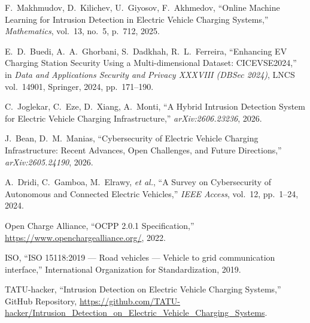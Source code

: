 \documentclass[11pt, a4paper]{article}
\begin{document}
\begin{enumerate}[leftmargin=1.6em, itemsep=0.3em, label={[\arabic*]}]
    \item F.~Makhmudov, D.~Kilichev, U.~Giyosov, F.~Akhmedov, ``Online Machine Learning for Intrusion Detection in Electric Vehicle Charging Systems,'' \textit{Mathematics}, vol.~13, no.~5, p.~712, 2025.

    \item E.~D.~Buedi, A.~A.~Ghorbani, S.~Dadkhah, R.~L.~Ferreira, ``Enhancing EV Charging Station Security Using a Multi-dimensional Dataset: CICEVSE2024,'' in \textit{Data and Applications Security and Privacy XXXVIII (DBSec 2024)}, LNCS vol.~14901, Springer, 2024, pp.~171--190.

    \item C.~Joglekar, C.~Eze, D.~Xiang, A.~Monti, ``A Hybrid Intrusion Detection System for Electric Vehicle Charging Infrastructure,'' \textit{arXiv:2606.23236}, 2026.

    \item J.~Bean, D.~M.~Manias, ``Cybersecurity of Electric Vehicle Charging Infrastructure: Recent Advances, Open Challenges, and Future Directions,'' \textit{arXiv:2605.24190}, 2026.

    \item A.~Dridi, C.~Gamboa, M.~Elrawy, \textit{et al.}, ``A Survey on Cybersecurity of Autonomous and Connected Electric Vehicles,'' \textit{IEEE Access}, vol.~12, pp.~1--24, 2024.

    \item Open Charge Alliance, ``OCPP 2.0.1 Specification,'' \url{https://www.openchargealliance.org/}, 2022.

    \item ISO, ``ISO 15118:2019 — Road vehicles — Vehicle to grid communication interface,'' International Organization for Standardization, 2019.

    \item TATU-hacker, ``Intrusion Detection on Electric Vehicle Charging Systems,'' GitHub Repository, \url{https://github.com/TATU-hacker/Intrusion_Detection_on_Electric_Vehicle_Charging_Systems}.
\end{enumerate}
\end{document}
